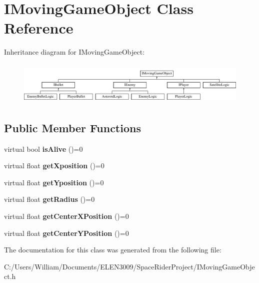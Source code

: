 \hypertarget{class_i_moving_game_object}{}\section{I\+Moving\+Game\+Object Class Reference}
\label{class_i_moving_game_object}
Inheritance diagram for I\+Moving\+Game\+Object\+:\begin{figure}[H]
\begin{center}
\leavevmode
\includegraphics[height=2.089552cm]{class_i_moving_game_object}
\end{center}
\end{figure}
\subsection*{Public Member Functions}
\begin{DoxyCompactItemize}
\item 
\mbox{\label{class_i_moving_game_object_ab88f75c872699dd1376e5e83f6188e34}} 
virtual bool {\bfseries is\+Alive} ()=0
\item 
\mbox{\label{class_i_moving_game_object_acc7f0195491b1843558c8c558cbc7363}} 
virtual float {\bfseries get\+Xposition} ()=0
\item 
\mbox{\label{class_i_moving_game_object_a153c0017219e17262a9cceddba3f61d6}} 
virtual float {\bfseries get\+Yposition} ()=0
\item 
\mbox{\label{class_i_moving_game_object_ab2120f126d088beda46654aa3ccfd705}} 
virtual float {\bfseries get\+Radius} ()=0
\item 
\mbox{\label{class_i_moving_game_object_ae4e6c21094ef1e2db32729270c8a7999}} 
virtual float {\bfseries get\+Center\+X\+Position} ()=0
\item 
\mbox{\label{class_i_moving_game_object_a075f69d69fd38dc02a0ec3c7b1cb0534}} 
virtual float {\bfseries get\+Center\+Y\+Position} ()=0
\end{DoxyCompactItemize}


The documentation for this class was generated from the following file\+:\begin{DoxyCompactItemize}
\item 
C\+:/\+Users/\+William/\+Documents/\+E\+L\+E\+N3009/\+Space\+Rider\+Project/I\+Moving\+Game\+Object.\+h\end{DoxyCompactItemize}
